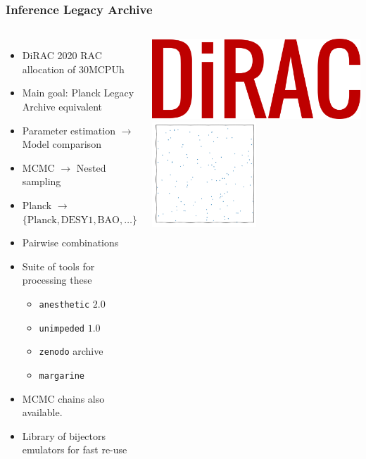 \documentclass[aspectratio=169]{beamer}
\begin{document}
\begin{frame}
    \frametitle{Inference Legacy Archive}
    \begin{columns}
        \begin{itemize}
            \item DiRAC 2020 RAC allocation of 30MCPUh
            \item Main goal: Planck Legacy Archive equivalent
            \item Parameter estimation $\to$ Model comparison
            \item MCMC $\to$ Nested sampling
            \item Planck $\to$ $\{\text{Planck}, \text{DESY1}, \text{BAO}, \ldots \}$
            \item Pairwise combinations
            \item Suite of tools for processing these 
                \begin{itemize}
                    \item \texttt{anesthetic} $2.0$
                    \item \texttt{unimpeded} $1.0$
                    \item \texttt{zenodo} archive
                    \item \texttt{margarine}
                \end{itemize}
            \item MCMC chains also available.
            \item Library of bijectors emulators for fast re-use
        \end{itemize}
        \includegraphics[width=\textwidth]{logos/dirac}
        \includegraphics[width=0.5\textwidth,page=21]{figures/himmelblau}%

\end{columns}
\end{frame}
\end{document}
